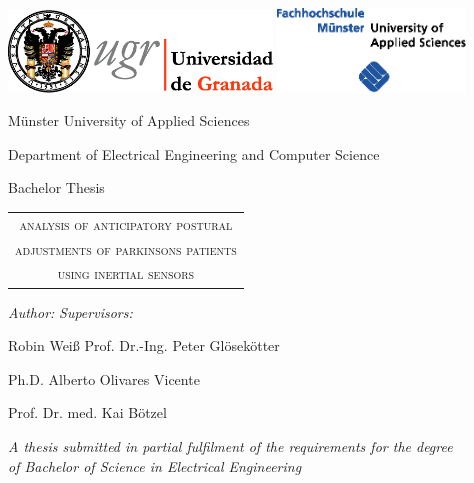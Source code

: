 \begin{titlepage}
\label{ch:titlepage}

\begin{center}

\includegraphics[width=7cm]{images/universidad_de_granada.eps}
	\hfill
\includegraphics[width=5cm]{images/fh-muenster.eps}
	\hspace{0.3cm} 

\vspace{2.5cm}

{\large Münster University of Applied Sciences}

Department of Electrical Engineering and Computer Science

\vspace{1cm}

{\Large Bachelor Thesis}

\vspace{0.8cm}

\begin{huge}
	\renewcommand{\arraystretch}{0.7}
	\begin{tabular}{c}
		\textsc{analysis of anticipatory postural} \\
	    \textsc{adjustments of parkinsons patients} \\
	    \textsc{using inertial sensors} \\
	\end{tabular}
\end{huge}

\end{center}

\vspace{1cm}

\textit{Author:}  \hfill \textit{Supervisors:}

Robin Weiß \hfill Prof. Dr.-Ing. Peter Gl\"{o}sek\"{o}tter 

\hfill Ph.D. Alberto Olivares Vicente

\hfill Prof. Dr. med. Kai B\"{o}tzel

\vspace{1cm}

\begin{center}
	
\textit{A thesis submitted in partial fulfilment of the requirements for the degree\\
of Bachelor of Science in Electrical Engineering}

\vfill

\monthname \: \the\year 

\end{center}

\end{titlepage}
